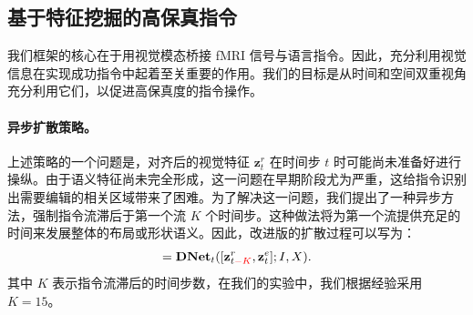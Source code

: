 \subsection{基于特征挖掘的高保真指令}
我们框架的核心在于用视觉模态桥接 fMRI 信号与语言指令。因此，充分利用视觉信息在实现成功指令中起着至关重要的作用。我们的目标是从时间和空间双重视角充分利用它们，以促进高保真度的指令操作。
\paragraph{异步扩散策略。} 上述策略的一个问题是，对齐后的视觉特征 $\textbf{z}_t^r$ 在时间步 $t$ 时可能尚未准备好进行操纵。由于语义特征尚未完全形成，这一问题在早期阶段尤为严重，这给指令识别出需要编辑的相关区域带来了困难。为了解决这一问题，我们提出了一种异步方法，强制指令流滞后于第一个流 $K$ 个时间步。这种做法将为第一个流提供充足的时间来发展整体的布局或形状语义。因此，改进版的扩散过程可以写为：
\begin{equation}
    [\textbf{z}_{(t\textcolor{red}{-K}-1)}^r, \textbf{z}_{(t-1)}^e] = \textbf{\text{DNet}}_{t}([\textbf{z}_{t\textcolor{red}{-K}}^r, \textbf{z}_t^e]; I, X).
\end{equation}
其中 $K$ 表示指令流滞后的时间步数，在我们的实验中，我们根据经验采用 $K=15$。

